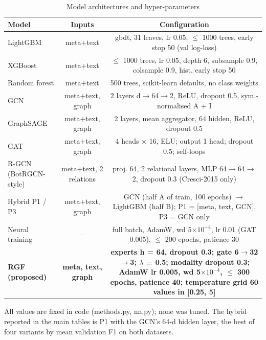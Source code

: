 \begin{table}[!t]
\caption{Model architectures and hyper-parameters}
\label{tab:architectures_hyperparameters}
\centering\footnotesize
\setlength{\tabcolsep}{3pt}
\begin{tabular}{lcc}
\hline
Model & Inputs & Configuration \\
\hline
LightGBM & meta+text & gbdt, 31 leaves, lr 0.05, $\le$ 1000 trees, early stop 50 (val log-loss) \\
XGBoost & meta+text & $\le$ 1000 trees, lr 0.05, depth 6, subsample 0.9, colsample 0.9, hist, early stop 50 \\
Random forest & meta+text & 500 trees, scikit-learn defaults, no class weights \\
GCN & meta+text, graph & 2 layers d$\rightarrow$64$\rightarrow$2, ReLU, dropout 0.5, sym.-normalised A + I \\
GraphSAGE & meta+text, graph & 2 layers, mean aggregator, 64 hidden, ReLU, dropout 0.5 \\
GAT & meta+text, graph & 4 heads $\times$ 16, ELU; output 1 head; dropout 0.5; self-loops \\
R-GCN (BotRGCN-style) & meta+text, 2 relations & proj. 64, 2 relational layers, MLP 64$\rightarrow$64$\rightarrow$2, dropout 0.3 (Cresci-2015 only) \\
Hybrid P1 / P3 & meta+text, graph & GCN (half A of train, 100 epochs) $\rightarrow$ LightGBM (half B); P1 = [meta, text, GCN], P3 = GCN only \\
Neural training & -- & full batch, AdamW, wd 5$\times10^{-4}$, lr 0.01 (GAT 0.005), $\le$ 200 epochs, patience 30 \\
\textbf{RGF (proposed)} & \textbf{meta, text, graph} & \textbf{experts h = 64, dropout 0.3; gate 6$\rightarrow$32$\rightarrow$3; $\lambda$ = 0.5; modality dropout 0.3; AdamW lr 0.005, wd 5$\times10^{-4}$, $\le$ 300 epochs, patience 40; temperature grid 60 values in [0.25, 5]} \\
\hline
\end{tabular}
\par\smallskip\parbox{\linewidth}{\scriptsize All values are fixed in code (methods.py, nn.py); none was tuned. The hybrid reported in the main tables is P1 with the GCN's 64-d hidden layer, the best of four variants by mean validation F1 on both datasets.}
\end{table}